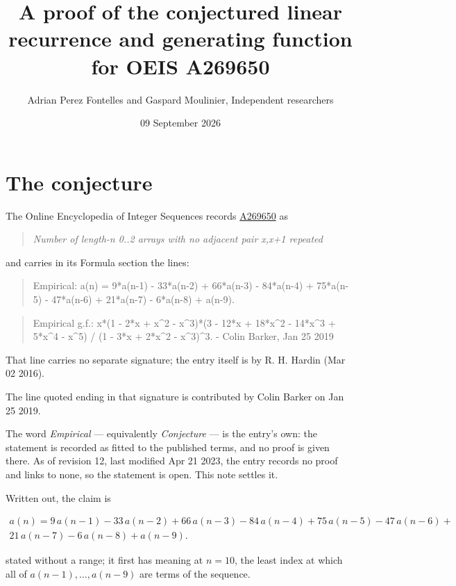 \documentclass[11pt]{article}
\title{A proof of the conjectured linear recurrence and generating function for OEIS A269650}
\author{Adrian Perez Fontelles and Gaspard Moulinier, Independent researchers}
\date{09 September 2026}
\theoremstyle{definition}
\begin{document}
\maketitle
\section{The conjecture}

The Online Encyclopedia of Integer Sequences records \href{https://oeis.org/A269650}{A269650} as

\begin{quote}\itshape Number of length-n 0..2 arrays with no adjacent pair x,x+1 repeated\end{quote}

and carries in its Formula section the lines:

\begin{quote}\ttfamily Empirical: a(n) = 9*a(n-1) - 33*a(n-2) + 66*a(n-3) - 84*a(n-4) + 75*a(n-5) - 47*a(n-6) + 21*a(n-7) - 6*a(n-8) + a(n-9).\end{quote}

\begin{quote}\ttfamily Empirical g.f.: x*(1 - 2*x + x\textasciicircum{}2 - x\textasciicircum{}3)*(3 - 12*x + 18*x\textasciicircum{}2 - 14*x\textasciicircum{}3 + 5*x\textasciicircum{}4 - x\textasciicircum{}5) / (1 - 3*x + 2*x\textasciicircum{}2 - x\textasciicircum{}3)\textasciicircum{}3. - Colin Barker, Jan 25 2019\end{quote}

That line carries no separate signature; the entry itself is by R. H. Hardin (Mar 02 2016).

The line quoted ending in that signature is contributed by Colin Barker on Jan 25 2019.

The word {\itshape Empirical} --- equivalently {\itshape Conjecture} --- is the entry's own: the statement is recorded as fitted to the published terms, and no proof is given there. As of revision 12, last modified Apr 21 2023, the entry records no proof and links to none, so the statement is open. This note settles it.

Written out, the claim is

\begin{multline*} a(n) = 9\,a(n-1) - 33\,a(n-2) + 66\,a(n-3) - 84\,a(n-4) + 75\,a(n-5) - 47\,a(n-6) + \\ 21\,a(n-7) - 6\,a(n-8) + a(n-9). \end{multline*}

stated without a range; it first has meaning at $n = 10$, the least index at which all of $a(n-1),\dots,a(n-9)$ are terms of the sequence.
\end{document}
